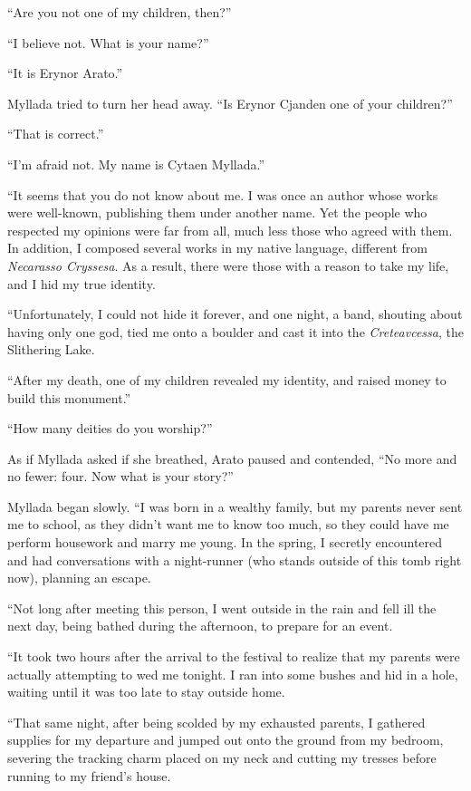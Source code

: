 ``Are you not one of my children, then?''

``I believe not. What is your name?''

``It is Erynor Arato.''

Myllada tried to turn her head away. ``Is Erynor Cjanden one of your children?''

``That is correct.''

``I'm afraid not. My name is Cytaen Myllada.''

``It seems that you do not know about me. I was once an author whose works were well-known, publishing them under another name. Yet the people who respected my opinions were far from all, much less those who agreed with them. In addition, I composed several works in my native language, different from \emph{Necarasso Cryssesa}. As a result, there were those with a reason to take my life, and I hid my true identity.

``Unfortunately, I could not hide it forever, and one night, a band, shouting about having only one god, tied me onto a boulder and cast it into the \emph{Creteavcessa}, the Slithering Lake.

``After my death, one of my children revealed my identity, and raised money to build this monument.''

``How many deities do you worship?''

As if Myllada asked if she breathed, Arato paused and contended, ``No more and no fewer: four. Now what is your story?''

Myllada began slowly. ``I was born in a wealthy family, but my parents never sent me to school, as they didn't want me to know too much, so they could have me perform housework and marry me young. In the spring, I secretly encountered and had conversations with a night-runner (who stands outside of this tomb right now), planning an escape.

``Not long after meeting this person, I went outside in the rain and fell ill the next day, being bathed during the afternoon, to prepare for an event.

``It took two hours after the arrival to the festival to realize that my parents were actually attempting to wed me tonight. I ran into some bushes and hid in a hole, waiting until it was too late to stay outside home.

``That same night, after being scolded by my exhausted parents, I gathered supplies for my departure and jumped out onto the ground from my bedroom, severing the tracking charm placed on my neck and cutting my tresses before running to my friend's house.

